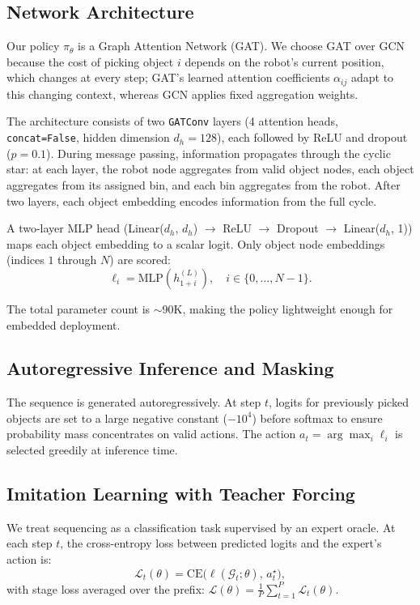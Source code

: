 \documentclass[conference]{IEEEtran}
\begin{document}
\subsection{Network Architecture}

Our policy $\pi_\theta$ is a Graph Attention Network (GAT). We choose GAT over GCN because the cost of picking object $i$ depends on the robot's current position, which changes at every step; GAT's learned attention coefficients $\alpha_{ij}$ adapt to this changing context, whereas GCN applies fixed aggregation weights.

The architecture consists of two \texttt{GATConv} layers (4 attention heads, \texttt{concat=False}, hidden dimension $d_h{=}128$), each followed by ReLU and dropout ($p{=}0.1$). During message passing, information propagates through the cyclic star: at each layer, the robot node aggregates from valid object nodes, each object aggregates from its assigned bin, and each bin aggregates from the robot. After two layers, each object embedding encodes information from the full cycle.

A two-layer MLP head (Linear($d_h$, $d_h$) $\to$ ReLU $\to$ Dropout $\to$ Linear($d_h$, 1)) maps each object embedding to a scalar logit. Only object node embeddings (indices $1$ through $N$) are scored:
\begin{equation}
\ell_i = \text{MLP}(h^{(L)}_{1+i}), \quad i \in \{0,\dots,N{-}1\}.
\end{equation}

The total parameter count is ${\sim}$90K, making the policy lightweight enough for embedded deployment.

\subsection{Autoregressive Inference and Masking}

The sequence is generated autoregressively. At step $t$, logits for previously picked objects are set to a large negative constant ($-10^4$) before softmax to ensure probability mass concentrates on valid actions. The action $a_t = \arg\max_i \ell_i$ is selected greedily at inference time.

\subsection{Imitation Learning with Teacher Forcing}

We treat sequencing as a classification task supervised by an expert oracle. At each step $t$, the cross-entropy loss between predicted logits and the expert's action is:
\begin{equation}
\mathcal{L}_t(\theta) = \text{CE}\big(\ell(\mathcal{G}_t;\theta),\, a_t^\star\big),
\end{equation}
with stage loss averaged over the prefix: $\mathcal{L}(\theta) = \frac{1}{P}\sum_{t=1}^{P}\mathcal{L}_t(\theta)$.
\end{document}
